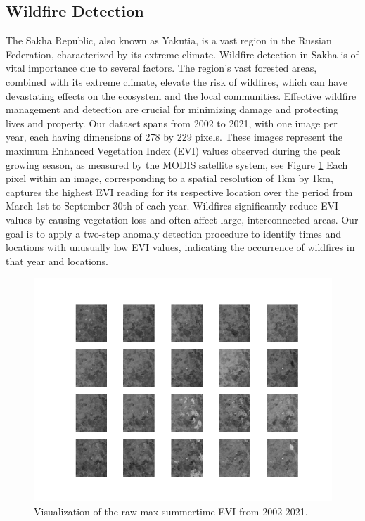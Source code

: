 \documentclass[11pt]{article}
\begin{document}
\subsection{Wildfire Detection}
The Sakha Republic, also known as Yakutia, is a vast region in the Russian Federation, characterized by its extreme climate. Wildfire detection in Sakha is of vital importance due to several factors. The region's vast forested areas, combined with its extreme climate, elevate the risk of wildfires, which can have devastating effects on the ecosystem and the local communities. Effective wildfire management and detection are crucial for minimizing damage and protecting lives and property. Our dataset spans from 2002 to 2021, with one image per year, each having dimensions of 278 by 229 pixels. These images represent the maximum Enhanced Vegetation Index (EVI) values observed during the peak growing season, as measured by the MODIS satellite system, see Figure \ref{fig: real data} Each pixel within an image, corresponding to a spatial resolution of 1km by 1km, captures the highest EVI reading for its respective location over the period from March 1st to September 30th of each year. Wildfires significantly reduce EVI values by causing vegetation loss and often affect large, interconnected areas. Our goal is to apply a two-step anomaly detection procedure to identify times and locations with unusually low EVI values, indicating the occurrence of wildfires in that year and locations.

\begin{figure}[h!]
    \centering
    \includegraphics[width=\textwidth]{../figure/raw_data}
    \caption{Visualization of the raw max summertime EVI from 2002-2021. }
    \label{fig: real data}
\end{figure}
\end{document}
